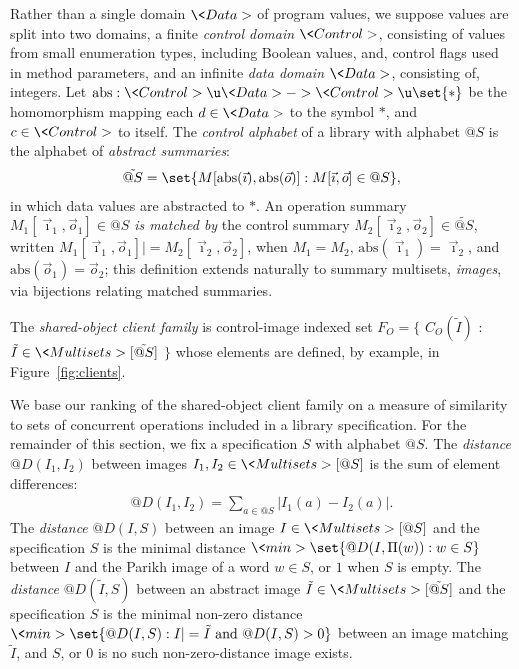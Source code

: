 Rather than a single domain $\<Data>$ of program values, we suppose values are
split into two domains, a finite \emph{control domain} $\<Control>$, consisting
of values from small enumeration types, including Boolean values, and, \eg
control flags used in method parameters, and an infinite \emph{data domain}
$\<Data>$, consisting of, \eg integers. Let $\mathrm{abs} : \<Control> \u
\<Data> -> \<Control> \u \set{ \ast }$ be the homomorphism mapping each $d \in
\<Data>$ to the symbol $\ast$, and $c \in \<Control>$ to itself. The
\emph{control alphabet} of a library with alphabet $@S$ is the alphabet of
\emph{abstract summaries}:
\begin{align*}
  \tilde{@S} = \set{ M[\mathrm{abs}(\vec{\imath}),\mathrm{abs}(\vec{o})] :
    M[\vec{\imath},\vec{o}] \in @S },
\end{align*}
in which data values are abstracted to $\ast$. An operation summary
$M_1[\vec{\imath}_1, \vec{o}_1] \in @S$ \emph{is matched by} the control
summary $M_2[\vec{\imath}_2, \vec{o}_2] \in \tilde{@S}$, written
$M_1[\vec{\imath}_1,\vec{o}_1] |= M_2[\vec{\imath}_2,\vec{o}_2]$, when $M_1 =
M_2$, $\mathrm{abs}(\vec{\imath}_1) = \vec{\imath}_2$, and
$\mathrm{abs}(\vec{o}_1) = \vec{o}_2$; this definition extends naturally to 
summary multisets, \ie \emph{images}, via bijections relating matched 
summaries.

\begin{definition}
  The \emph{shared-object client family} is control-image indexed set 
  $F_O = \{$ $C_O(\tilde{I})$ : $\tilde{I} \in \<Multisets>[\tilde{@S}]$ $\}$ 
  whose elements are defined, by example, in Figure~\ref{fig:clients}.
\end{definition}

We base our ranking of the shared-object client family on a measure of
similarity to sets of concurrent operations included in a library
specification. For the remainder of this section, we fix a specification $S$
with alphabet $@S$. The \emph{distance} $@D(I_1,I_2)$ between images $I_1, I_2
\in \<Multisets>[@S]$ is the sum of element differences:
\begin{align*}
  @D(I_1, I_2) = 
    \sum_{a \in @S} \bigl| I_1(a) - I_2(a) \bigr|.
\end{align*}
The \emph{distance} $@D(I,S)$ between an image $I \in \<Multisets>[@S]$ and the
specification $S$ is the minimal distance $\<min>\set{ @D(I,\Pi(w)) : w \in S}$
between $I$ and the Parikh image of a word $w \in S$, or $1$ when $S$ is empty.
The \emph{distance} $@D(\tilde{I},S)$ between an abstract image $\tilde{I} \in
\<Multisets>[\tilde{@S}]$ and the specification $S$ is the minimal non-zero
distance $\<min>\set{ @D(I,S) : I |= \tilde{I} \text{ and } @D(I,S) > 0 }$
between an image matching $\tilde{I}$, and $S$, or $0$ is no such
non-zero-distance image exists.

